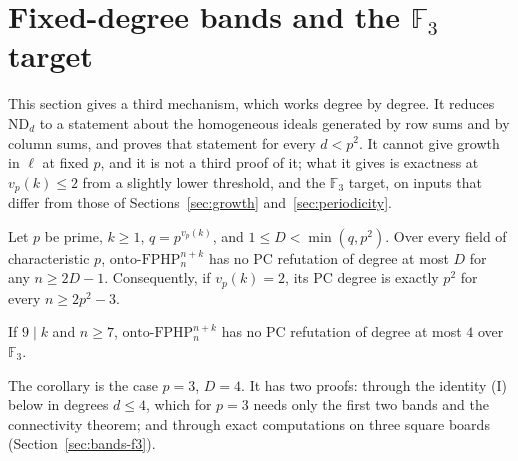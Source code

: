 
\section{Fixed-degree bands and the \texorpdfstring{$\mathbb F_3$}{F3} target}\label{sec:bands}

This section gives a third mechanism, which works degree by degree.  It reduces
$\mathrm{ND}_d$ to a statement about the homogeneous ideals generated by row sums and by
column sums, and proves that statement for every $d<p^2$.  It cannot give growth in $\ell$ at
fixed $p$, and it is not a third proof of it; what it gives is exactness at
$v_p(k)\le2$ from a slightly lower threshold, and the $\mathbb F_3$ target, on inputs that
differ from those of Sections~\ref{sec:growth} and~\ref{sec:periodicity}.

\begin{theorem}[F]\label{thm:bands}
Let $p$ be prime, $k\ge1$, $q=p^{v_p(k)}$, and $1\le D<\min(q,p^2)$.  Over every field of
characteristic $p$, $\mathrm{onto\text{-}FPHP}^{n+k}_n$ has no PC refutation of degree at
most $D$ for any $n\ge2D-1$.  Consequently, if $v_p(k)=2$, its PC degree is exactly $p^2$
for every $n\ge2p^2-3$.
\end{theorem}

\begin{corollary}\label{cor:f3}
If $9\mid k$ and $n\ge7$, $\mathrm{onto\text{-}FPHP}^{n+k}_n$ has no PC refutation of degree
at most $4$ over $\mathbb F_3$.
\end{corollary}

The corollary is the case $p=3$, $D=4$.  It has two proofs: through the identity (I) below in
degrees $d\le4$, which for $p=3$ needs only the first two bands and the connectivity theorem;
and through exact computations on three square boards (Section~\ref{sec:bands-f3}).

